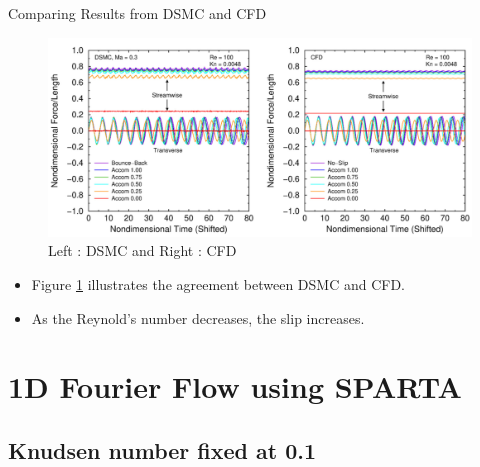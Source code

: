 \documentclass{beamer}
\begin{document}
        \begin{frame}{Comparing Results from DSMC and CFD}
            \begin{figure}
                \centering
                \includegraphics[width=0.7\linewidth]{Pictures/Literature/Compare.png}
                \caption{Left : DSMC and Right : CFD}
                \label{gra:Comp}
            \end{figure}

            \begin{itemize}
                \setlength\itemsep{0.25cm}
                                
                \item<1->Figure \ref{gra:Comp} illustrates the agreement between DSMC and CFD.

                \item<2-> As the Reynold's number decreases, the slip increases.
            \end{itemize}
        \end{frame}

\section{1D Fourier Flow using SPARTA}

    \subsection{Knudsen number fixed at 0.1}
\end{document}
